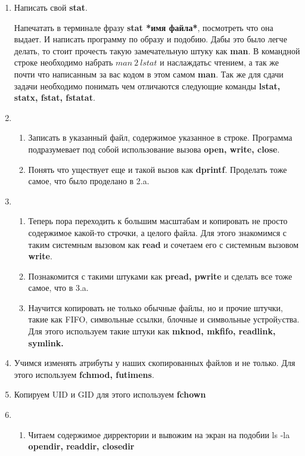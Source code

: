 \begin{enumerate}
    \item Написать свой \textbf{stat}. 
    
    Напечатать в терминале фразу \textbf{stat *имя файла*}, посмотреть что она выдает. И написать программу по образу и подобию. Дабы это было легче делать, то стоит прочесть такую замечательную штуку как \textbf{man}. В командной строке необходимо набрать $man\ 2\ lstat$ и наслаждатьс чтением, а так же почти что написанным за вас кодом в этом самом \textbf{man}. Так же для сдачи задачи необходимо понимать чем отличаются следующие команды \textbf{lstat, statx, fstat, fstatat}. 
    \item
    \begin{enumerate}
        \item Записать в указанный файл, содержимое указанное в строке. Программа подразумевает под собой использование вызова \textbf{open, write, close}.  
        \item Понять что уществует еще и такой вызов как \textbf{dprintf}. Проделать тоже самое, что было проделано в 2.a. 
    \end{enumerate}
    
    \item 
    
    \begin{enumerate}
        \item Теперь пора переходить к большим масштабам и копировать не просто содержимое какой-то строчки, а целого файла. Для этого знакомимся с таким системным вызовом как \textbf{read} и сочетаем его с системным вызовом \textbf{write}. 
        
        \item Познакомится с такими штуками как \textbf{pread, pwrite} и сделать все тоже самое, что в 3.a. 
        
        \item Научится копировать не только обычные файлы, но и прочие штучки, такие как FIFO, символьные ссылки, блочные и символьные устройyства. Для этого используем такие штуки как \textbf{mknod, mkfifo, readlink, symlink.}   
    \end{enumerate}
    
    \item Учимся изменять атрибуты у наших скопированных файлов и не только. Для этого используем \textbf{fchmod, futimens}. 
    
    \item Копируем UID и GID для этого используем \textbf{fchown} 
    \item 
    \begin{enumerate}
        \item Читаем содержимое дирректории и вывожим на экран на подобии ls -la \textbf{opendir, readdir, closedir} 
        

\end{enumerate}
\end{enumerate}
